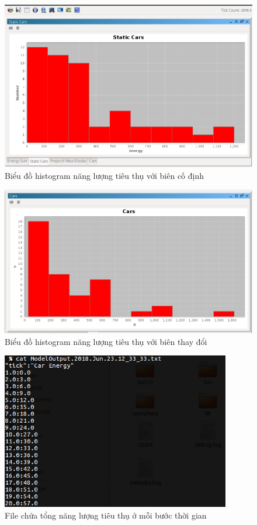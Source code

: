 \documentclass[../report.tex]{subfiles}
\begin{document}
\begin{figure}[H]
\centering
\includegraphics[width=14cm]{figures/static-histogram.png}
\caption{Biểu đồ histogram năng lượng tiêu thụ với biên cố định}
\end{figure}

\begin{figure}[H]
\centering
\includegraphics[width=14cm]{figures/dynamic-histogram.png}
\caption{Biểu đồ histogram năng lượng tiêu thụ với biên thay đổi}
\end{figure}

\begin{figure}[H]
\centering
\includegraphics[width=10cm]{figures/output-file.png}
\caption{File chứa tổng năng lượng tiêu thụ ở mỗi bước thời gian}
\end{figure}
\end{document}
